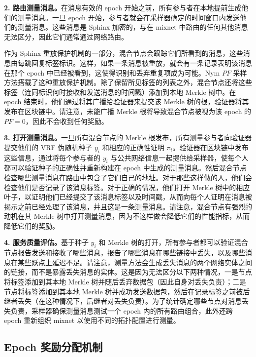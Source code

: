 \documentclass{article}
\begin{document}
	\textbf{2. 路由测量消息。}在消息有效的 epoch 开始之前，所有参与者在本地提前生成他们的测量消息。一旦 epoch 开始，参与者就会在采样器确定的时间窗口内发送他们的测量消息。这些消息是 Sphinx 加密的，与在 mixnet 中路由的任何其他消息无法区分，因此它们通常通过网络路由。\newline

	作为 Sphinx 重放保护机制的一部分，混合节点会跟踪它们所看到的消息，这些消息由每跳回复标签标识。这样，如果一条消息被重放，就会有一条记录表明该消息在那个 epoch 中已经被看到，这使得识别和丢弃重复项成为可能。Nym $PF$ 采样方法搭载了这种重放保护机制。除了保留所见标签的列表之外，混合节点还将这些标签（连同标识何时接收和发送消息的时间戳）添加到本地 Merkle 树中。在 epoch 结束时，他们通过将其广播给验证器来提交该 Merkle 树的根，验证器将其发布在区块链中。请注意，未能广播 Merkle 根将导致混合节点被视为该 epoch 的 $PF = 0$，因此不会收到任何奖励。\newline

	\textbf{3. 打开测量消息。}一旦所有混合节点的 Merkle 根发布，所有测量参与者向验证器提交他们的 VRF 伪随机种子 $y_{i}$ 和相应的正确性证明 $\pi_{i}$。验证器在区块链中发布这些信息，通过将每个参与者的 $y_{i}$ 与公共网络信息一起提供给采样器，使每个人都可以验证种子的正确性并重新构建在 epoch 中生成的测量消息。然后混合节点检查哪些测量消息在路由中包含了它们自己的地址。对于那些这样做的人，他们会检查他们是否记录了该消息标签。对于正确的情况，他们打开 Merkle 树中的相应叶子，以证明他们已经提交了该消息标签以及时间戳，从而向每个人证明在消息被揭示之前已经处理了该消息，并且这是一条测量消息。请注意，混合节点有强烈的动机在其 Merkle 树中打开测量消息，因为不这样做会降低它们的性能指标，从而降低它们的奖励。\newline

	\textbf{4. 服务质量评估。}基于种子 $y_{i}$ 和 Merkle 树的打开，所有参与者都可以验证混合节点报告发送和接收了哪些消息，报告了哪些消息在哪些链接中丢失，以及哪些消息在某些跃点上延迟不足。请注意，测量方法会生成丢失消息的两个网络实体之间的链接，而不是暴露丢失消息的实体。这是因为无法区分以下两种情况，一是节点将标签添加到其本地 Merkle 树并随后丢弃数据包（因此自身对丢失负责）；二是节点将标签添加到其本地 Merkle 树并成功发送数据包，然后在记录标签之前被后继者丢失（在这种情况下，后继者对丢失负责）。为了统计确定哪些节点对消息丢失负责，采样器确保测量消息测试一个 epoch 内的所有路由组合，此外还跨 epoch 重新组织 mixnet 以使用不同的拓扑配置进行测量。\newline

	\subsection{Epoch 奖励分配机制}
\end{document}
